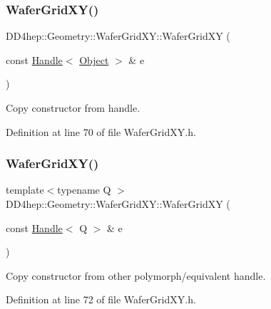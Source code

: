 \subsubsection{\texorpdfstring{Wafer\+Grid\+X\+Y()}{WaferGridXY()}\hspace{0.1cm}{\footnotesize\ttfamily [4/5]}}
{\footnotesize\ttfamily D\+D4hep\+::\+Geometry\+::\+Wafer\+Grid\+X\+Y\+::\+Wafer\+Grid\+XY (\begin{DoxyParamCaption}\item[{const \hyperlink{class_d_d4hep_1_1_handle}{Handle}$<$ \hyperlink{class_d_d4hep_1_1_geometry_1_1_wafer_grid_x_y_a94a234312cc2c123569319d3d33b24e0}{Object} $>$ \&}]{e }\end{DoxyParamCaption})\hspace{0.3cm}{\ttfamily [inline]}}



Copy constructor from handle. 



Definition at line 70 of file Wafer\+Grid\+X\+Y.\+h.

\hypertarget{class_d_d4hep_1_1_geometry_1_1_wafer_grid_x_y_a7fbb6a82ca3ffb24be30752179e84a27}{}\label{class_d_d4hep_1_1_geometry_1_1_wafer_grid_x_y_a7fbb6a82ca3ffb24be30752179e84a27} 
\subsubsection{\texorpdfstring{Wafer\+Grid\+X\+Y()}{WaferGridXY()}\hspace{0.1cm}{\footnotesize\ttfamily [5/5]}}
{\footnotesize\ttfamily template$<$typename Q $>$ \\
D\+D4hep\+::\+Geometry\+::\+Wafer\+Grid\+X\+Y\+::\+Wafer\+Grid\+XY (\begin{DoxyParamCaption}\item[{const \hyperlink{class_d_d4hep_1_1_handle}{Handle}$<$ Q $>$ \&}]{e }\end{DoxyParamCaption})\hspace{0.3cm}{\ttfamily [inline]}}



Copy constructor from other polymorph/equivalent handle. 



Definition at line 72 of file Wafer\+Grid\+X\+Y.\+h.



